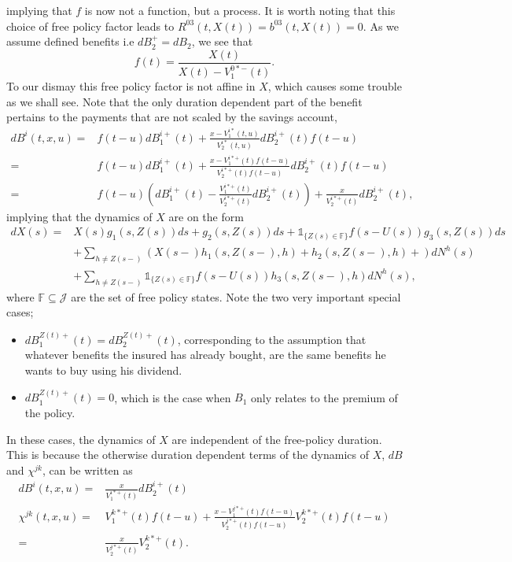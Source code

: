 \documentclass[12pt]{article}
\newcommand{\indic}[1]{\mathds{1}_{ \{ #1 \} }}
\theoremstyle{my_thm}
\begin{document}
implying that $f$ is now not a function, but a process. It is worth noting that this choice of free policy factor leads to $R^{03}(t,X(t))=b^{03}(t,X(t))=0$. As we assume defined benefits i.e $dB_2^+=dB_2$, we see that
$$
f(t)=\frac{X(t)}{X(t)-V_1^{0*-}(t)}.
$$
To our dismay this free policy factor is not affine in $X$, which causes some trouble as we shall see. Note that the only duration dependent part of the benefit pertains to the payments that are not scaled by the savings account,
\begin{align*}
dB^i(t,x,u)=&f(t-u)dB^{i+}_1(t)+\frac{x-V_1^{i*}(t,u)}{V_2^{i*}(t,u)}dB_2^{i+}(t)f(t-u)
\\
=&
f(t-u)dB^{i+}_1(t)+\frac{x-V_1^{i*+}(t)f(t-u)}{V_2^{i*+}(t)f(t-u)}dB_2^{i+}(t)f(t-u)
\\
=&
f(t-u)\left( dB^{i+}_1(t) - \frac{V_1^{i*+}(t)}{V_2^{i*+}(t)}dB_2^{i+}(t) \right)  +\frac{x}{V_2^{i*+}(t)}dB_2^{i+}(t),
\end{align*}
implying that the dynamics of $X$ are on the form
\begin{align}
dX(s)=&X(s)g_1(s,Z(s))ds+g_2(s,Z(s))ds +  \indic{Z(s)\in \mathbb{F}} f(s-U(s)) g_3(s,Z(s))ds \label{eq:AAK} \\
&+
\sum_{h\neq Z(s-)} \left( X(s-)h_1(s,Z(s-),h)+ h_2(s,Z(s-),h) + \right) dN^h(s)
\nonumber \\
&+
\sum_{h\neq Z(s-)}  \indic{Z(s)\in \mathbb{F}} f(s-U(s))h_3(s,Z(s-),h) dN^h(s),
\nonumber
\end{align}
where $\mathbb{F} \subseteq \mathcal{J}$ are the set of free policy states. Note the two very important special cases;
\begin{itemize}
\item $dB_1^{Z(t)+}(t)=dB_2^{Z(t)+}(t)$, corresponding to the assumption that whatever benefits the insured has already bought, are the same benefits he wants to buy using his dividend.
\item $dB_1^{Z(t)+}(t)=0$, which is the case when $B_1$ only relates to the premium of the policy. 
\end{itemize}  In these cases, the dynamics of $X$ are independent of the free-policy duration. This is because the otherwise duration dependent terms of the dynamics of $X$, $dB$ and $\chi^{jk}$, can be written as
\begin{align*}
dB^i(t,x,u)=&\frac{x}{V_1^{i*+}(t)}dB_2^{i+}(t)
\\
\chi^{jk}(t,x,u)=&V_1^{k*+}(t)f(t-u)+\frac{x-V_1^{j*+}(t)f(t-u)}{V_2^{j*+}(t)f(t-u)}V_2^{k*+}(t)f(t-u)
\\
=&
\frac{x}{V_2^{j*+}(t)}V_2^{k*+}(t).
\end{align*}
\end{document}
